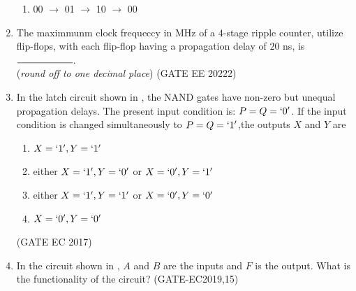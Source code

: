 \begin{enumerate}[label=\arabic*.,ref=\theenumi]
\begin{enumerate}
    \item 00 $\to$ 01 $\to$ 10 $\to$ 00
\end{enumerate}
\iffalse
\item The maximmunm clock frequeccy in MHz of a $4$-stage ripple counter, utilize flip-flops, with each flip-flop having a propagation delay of $20$ ns, is $\rule{2cm}{0.15mm}$.\\
(\textit{round off to one decimal place})
\hfill{(GATE EE 20222)}
%		
\item In the latch circuit shown
in
, the NAND gates have non-zero but unequal propagation delays. The present input condition is: $P=Q=\lq 0\rq$. If the input condition is changed simultaneously to $P=Q=\lq 1\rq$,the outputs $X$ and $Y$ are 
\begin{figure}[H]
\centering
\resizebox{0.75\columnwidth}{!}{%

	}
	\caption{}
\label{figure_1}
\end{figure}
\begin{enumerate}
\item $X=\lq 1\rq,Y=\lq 1 \rq$
\item either $X=\lq 1\rq,Y=\lq 0\rq$ or $X=\lq 0\rq,Y=\lq 1\rq$
\item either $X=\lq 1\rq,Y=\lq 1\rq$ or $X=\lq 0\rq,Y=\lq 0\rq$
\item $X=\lq 0\rq,Y=\lq 0 \rq$
\end{enumerate}
\hfill(GATE EC 2017)
\item In the circuit shown
	   in ,
	$A$ and $B$ are the inputs and $F$ is the output. What is the functionality of the circuit?
           \hfill(GATE-EC2019,15)
           

\end{enumerate}
